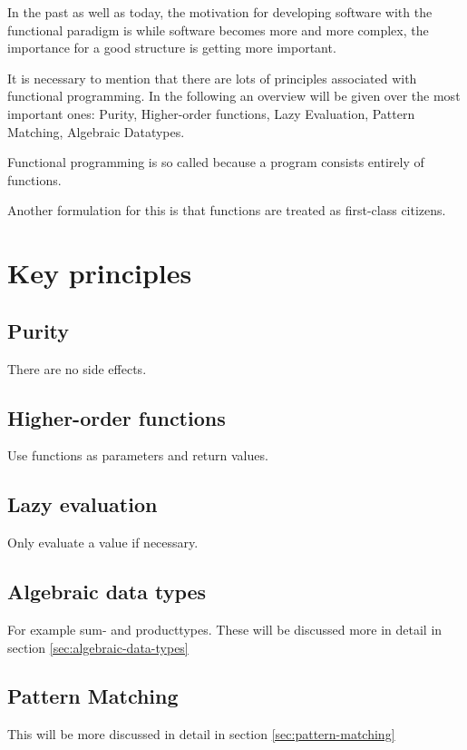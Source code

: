 In the past as well as today, the motivation for developing software with the functional paradigm is while software becomes more and more complex, the importance for a good structure is getting more important.\cite{Hughes1989}

It is necessary to mention that there are lots of principles associated with functional programming. In the following an overview will be given over the most important ones: Purity, Higher-order functions, Lazy Evaluation, Pattern Matching, Algebraic Datatypes.

\begin{shaded}
    \noindent
    \glqq{}Functional programming is so called because a program consists entirely of functions.\grqq{} \cite{Hughes1989}
\end{shaded}
Another formulation for this is that functions are treated as first-class citizens.

    \section{Key principles}
        \subsection{Purity}
        There are no side effects.

        \subsection{Higher-order functions}
        Use functions as parameters and return values.

        \subsection{Lazy evaluation}
        Only evaluate a value if necessary.

        \subsection{Algebraic data types}
        For example sum- and producttypes. These will be discussed more in detail in section \ref{sec:algebraic-data-types}

        \subsection{Pattern Matching}
        This will be more discussed in detail in section \ref{sec:pattern-matching}


